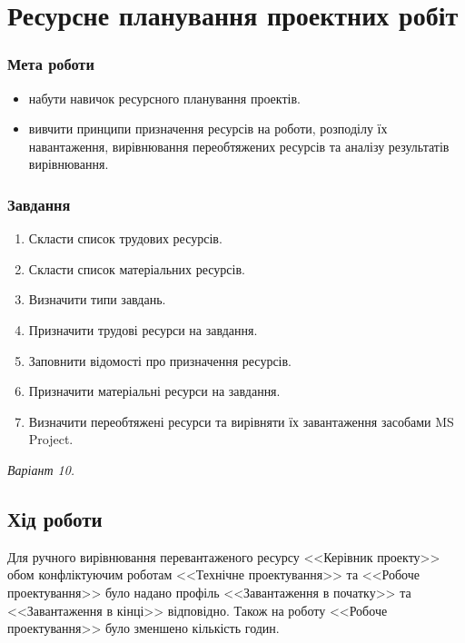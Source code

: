 



\newcommand{\labnumber}{2}



\graphicspath{{figures/}}


\Ukrainian


\addtocounter{page}{1}

\section*{Ресурсне планування проектних робіт}
\subsubsection*{Мета роботи}
\begin{itemize}
	\item набути навичок ресурсного планування проектів.
	\item вивчити принципи призначення ресурсів на роботи, розподілу їх навантаження, вирівнювання переобтяжених ресурсів та аналізу результатів вирівнювання.
\end{itemize}

\subsubsection*{Завдання}
\begin{enumerate}
  	\item Скласти список трудових ресурсів.
  	\item Скласти список матеріальних ресурсів.
  	\item Визначити типи завдань.
  	\item Призначити трудові ресурси на завдання.
  	\item Заповнити відомості про призначення ресурсів.
  	\item Призначити матеріальні ресурси на завдання.
  	\item Визначити переобтяжені ресурси та вирівняти їх завантаження засобами MS Project.
\end{enumerate}

\textit{Варіант 10.}

\subsection*{Хід роботи}
Для ручного вирівнювання перевантаженого ресурсу <<Керівник проекту>> обом конфліктуючим роботам <<Технічне проектування>> та <<Робоче проектування>> було надано профіль <<Завантаження в початку>> та <<Завантаження в кінці>> відповідно. Також на роботу <<Робоче проектування>> було зменшено кількість годин.  

